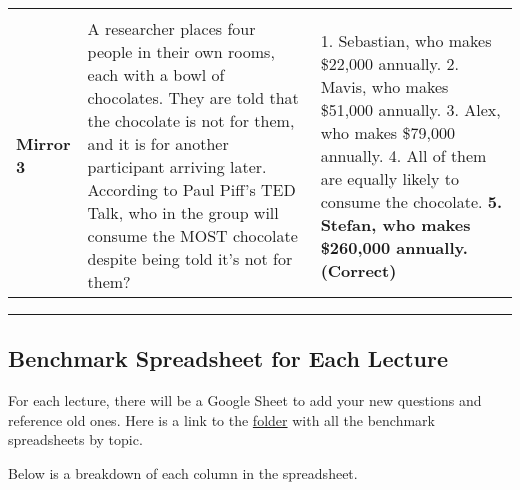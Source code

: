 \documentclass[
]{article}
\begin{document}
\begin{longtable}[]{@{}lll@{}}
\begin{minipage}[t]{0.48\columnwidth}
\end{minipage}\tabularnewline
\begin{minipage}[t]{0.05\columnwidth}\raggedright
\textbf{Mirror 3}\strut
\end{minipage} & \begin{minipage}[t]{0.38\columnwidth}\raggedright
A researcher places four people in their own rooms, each with a bowl of chocolates. They are told that the chocolate is not for them, and it is for another participant arriving later. According to Paul Piff's TED Talk, who in the group will consume the MOST chocolate despite being told it's not for them?\strut
\end{minipage} & \begin{minipage}[t]{0.48\columnwidth}\raggedright
1. Sebastian, who makes \$22,000 annually. 2. Mavis, who makes \$51,000 annually. 3. Alex, who makes \$79,000 annually. 4. All of them are equally likely to consume the chocolate. \textbf{5. Stefan, who makes \$260,000 annually. (Correct)}\strut
\end{minipage}\tabularnewline
\bottomrule
\end{longtable}

\begin{center}\rule{0.5\linewidth}{0.5pt}\end{center}

\hypertarget{benchmark-spreadsheet-for-each-lecture}{%
\subsection{Benchmark Spreadsheet for Each Lecture}\label{benchmark-spreadsheet-for-each-lecture}}

For each lecture, there will be a Google Sheet to add your new questions and reference old ones. Here is a link to the \href{https://drive.google.com/drive/u/2/folders/1bng_NaPPPm0RomhilhfiZkOEFT6XKk87}{folder} with all the benchmark spreadsheets by topic.

Below is a breakdown of each column in the spreadsheet.
\end{document}
